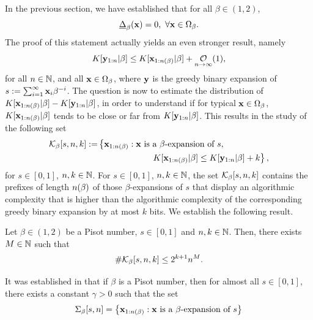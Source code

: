 	In the previous section, we have established that for all $\beta \in (1,2)$, 
	\begin{equation}
		\underline{\Delta}_\beta(\xf) = 0, \ \forall \xf \in \Omega_\beta.
	\end{equation}
	The proof of this statement actually yields an even stronger result, namely 
	\begin{equation}
		K[\yf_{1:n}|\beta] \leq K[\xf_{1:\nlogbeta}|\beta] + \bigOx[1]{n},
	\end{equation}
	for all $n \in \mathbb{N}$, and all ${\bf x} \in \Omega_\beta$, where ${\bf y}$ is the greedy binary expansion of $s := \sum_{i=1}^\infty {\bf x}_i \beta^{-i}$. The question is now to estimate the distribution of $K[{\bf x}_{1:n(\beta)}|\beta] - K[{\bf y}_{1:n}|\beta]$, in order to understand if for typical ${\bf x} \in \Omega_\beta$, $K[{\bf x}_{1:n(\beta)}|\beta]$ tends to be close or far from $K[{\bf y}_{1:n}|\beta]$. This results in the study of the following set
	\begin{align}
		\KK_\beta[s,n,k] := & \left\{ \xf_{1:\nlogbeta}: \xf \ \text{is a} \ \beta\text{-expansion of} \ s,\right. \nonumber\\
		& \hspace{0.86in}\left. K[\xf_{1:\nlogbeta}|\beta] \leq K[\yf_{1:n}|\beta] + k\right\},
	\end{align}
	for $s \in [0,1]$, $n,k \in \mathbb{N}$. For $s \in [0,1]$, $n,k \in \mathbb{N}$, the set $\mathcal{K}_\beta[s,n,k]$ contains the prefixes of length $n(\beta)$ of those $\beta$-expansions of $s$ that display an algorithmic complexity that is higher than the algorithmic complexity of the corresponding greedy binary expansion by at most $k$ bits. We establish the following result.
	\begin{theorem}\label{thm:distribution of algorithmic complexity of beta expansions when beta is pisot}
		Let $\beta \in (1,2)$ be a Pisot number, $s \in [0,1]$ and $n,k \in \mathbb{N}$. Then, there exists $M \in \mathbb{N}$ such that
		\begin{equation}
			\# \mathcal{K}_\beta[s,n,k] \leq 2^{k+1} n^M.
		\end{equation}
	\end{theorem}
	It was established in \cite[Theorem 1]{feng2010GrowthRatebetaexpansions} that if $\beta$ is a Pisot number, then for almost all $s \in [0,1]$, there exists a constant $\gamma > 0$ such that the set 
	\begin{equation}
		\Sigma_\beta[s,n] = \left\{ {\bf x}_{1:n(\beta)}: {\bf x} \ \text{is a} \ \beta\text{-expansion of}\ s\right\}
	\end{equation}

